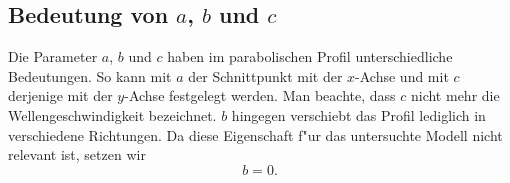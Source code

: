 \subsection{Bedeutung von \texorpdfstring{$a$}{a}, \texorpdfstring{$b$}{b} und 
\texorpdfstring{$c$}{c}}

Die Parameter $a$, $b$ und $c$ haben im parabolischen Profil unterschiedliche 
Bedeutungen. So kann mit $a$ der Schnittpunkt mit der $x$-Achse 
und mit $c$ derjenige mit der $y$-Achse festgelegt werden. Man beachte, dass 
$c$ nicht mehr die Wellengeschwindigkeit bezeichnet. $b$ hingegen 
verschiebt das Profil lediglich in verschiedene Richtungen. Da diese 
Eigenschaft f"ur das untersuchte Modell nicht relevant ist, setzen wir
\begin{equation*}
	b = 0.
\end{equation*}